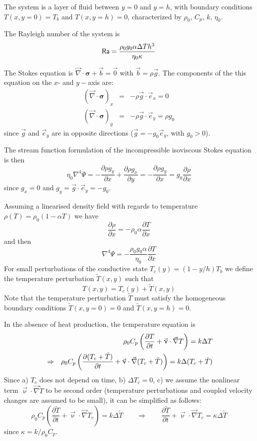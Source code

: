 

The system is a layer of fluid between $y=0$ and $y=h$, with boundary conditions $T(x,y=0)=T_b$ 
and $T(x,y=h)=0$, characterized by $\rho_0$, $C_p$, $k$, $\eta_0$. 

The Rayleigh number of the system is 
\[
{\mathsf{Ra}}= \frac{\rho_0 g_0 \alpha \Delta T h^3}{\eta_0 \kappa}
\]

The Stokes equation is $\vec \nabla \cdot \bm \sigma + \vec b = \vec 0$ with $\vec b=\rho \vec g$. 
The components of the this equation on the $x$- and $y-$axis are:
\begin{eqnarray}
(\vec \nabla \cdot \bm \sigma)_x &=& - \rho \vec g \cdot \vec e_x = 0\\ 
(\vec \nabla \cdot \bm \sigma)_y &=& - \rho \vec g \cdot \vec e_y = \rho g_0
\end{eqnarray}
since $\vec g$ and $\vec e_y$ are in opposite directions ($\vec g = - g_0 \vec e_y$, with $g_0>0$).

The stream function formulation of the incompressible isoviscous Stokes equation is then
\[
\eta_0 \nabla^4 \Psi
= -\frac{\partial \rho g_y}{\partial x} + \frac{\partial \rho g_x}{\partial y}   
= -\frac{\partial \rho g_y}{\partial x} 
=  g_0 \frac{\partial \rho}{\partial x} 
\]
since $g_x=0$ and $g_y=\vec{g}\cdot\vec{e}_y=-g_0$.

Assuming a linearised density field with regards to temperature $\rho(T)=\rho_0 (1-\alpha T)$
we have 
\[
\frac{\partial \rho}{\partial x} 
=
-\rho_0 \alpha \frac{\partial T}{\partial x} 
\]
and then 
\begin{equation}
\boxed{
\nabla^4 \Psi= -\frac{\rho_0 g_0 \alpha}{\eta_0} \frac{\partial T}{\partial x} 
}
\end{equation}
For small perturbations of the conductive state $T_c(y)=(1-y/h)T_b$ 
we define the temperature perturbation $\tilde{T}(x,y)$ such that 
\[
T(x,y)=T_c(y)+\tilde{T}(x,y)
\]
Note that the temperature perturbation $\tilde{T}$ must satisfy the homogeneous boundary 
conditions $\tilde{T}(x,y=0)=0$ and $\tilde{T}(x,y=h)=0$.

In the absence of heat production, the temperature equation is 
\begin{eqnarray}
&& \rho_0 C_p \left( \frac{\partial T}{\partial t} + {\vec \upnu}\cdot {\vec \nabla} T \right) 
= k \Delta T \nonumber\\
&\Rightarrow&
\rho_0 C_p \left( \frac{\partial (T_c+\tilde{T})}{\partial t} + {\vec \upnu}\cdot {\vec \nabla} 
(T_c+\tilde{T}) \right) 
= k \Delta (T_c+\tilde{T})
\end{eqnarray}
Since a) $T_c$ does not depend on time, b) $\Delta T_c=0$, c) we assume the nonlinear 
term ${\vec \upnu}\cdot {\vec \nabla} \tilde{T} $ to be second order (temperature perturbations and 
coupled velocity changes are assumed to be small), it can be simplified as follows:
\[
\rho_0 C_p \left( \frac{\partial \tilde{T}}{\partial t} + {\vec \upnu}\cdot {\vec \nabla} T_c \right) 
= k \Delta \tilde{T}
\qquad
\Rightarrow
\qquad
\frac{\partial \tilde{T}}{\partial t} + {\vec \upnu}\cdot {\vec \nabla} T_c 
= \kappa \Delta \tilde{T}
\]
since $\kappa =k/\rho_0 C_p$.

